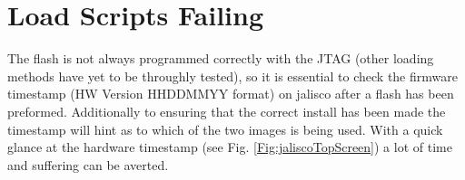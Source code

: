 \section{Load Scripts Failing}
The flash is not always programmed correctly with the JTAG (other loading methods have yet to be throughly tested), so it is essential to check the firmware timestamp (HW Version HHDDMMYY format) on \gls{jalisco} after a flash has been preformed. Additionally to ensuring that the correct install has been made the timestamp will hint as to which of the two images is being used. With a quick glance at the hardware timestamp (see Fig. \ref{Fig:jaliscoTopScreen}) a lot of time and suffering can be averted.

